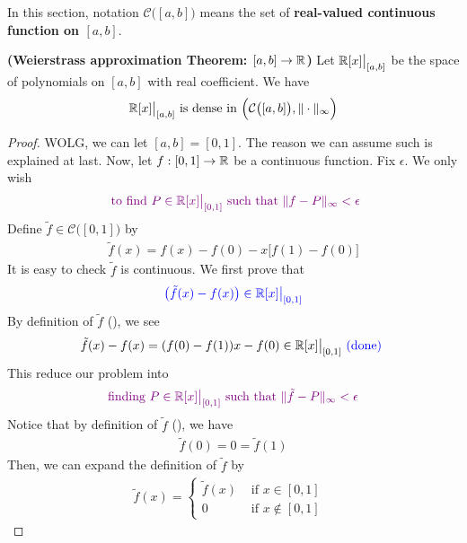 \documentclass{report}
\begin{document}
\begin{mdframed}
In this section, notation  $\mathcal{C}\big([a,b] \big)$ means the set of \textbf{real-valued continuous function on $[a,b]$}.
\end{mdframed}
\begin{theorem}
\label{WaT}
\textbf{(Weierstrass approximation Theorem: $[a,b]\rightarrow \mathbb{R}$)} Let $\mathbb{R}[x]\big|_{[a,b]}$ be the space of polynomials on $[a,b]$ with real coefficient. We have 
\begin{align*}
\text{ $\mathbb{R}[x]\big|_{[a,b]}$ is dense in $\Big(\mathcal{C}\big([a,b] \big),\| \cdot \|_{\infty} \Big)$ }
\end{align*}
\end{theorem}
\begin{proof}
WOLG, we can let $[a,b]=[0,1]$. The reason we can assume such is explained at last. Now, let $f:[0,1]\rightarrow \mathbb{R}$ be a continuous function. Fix $\epsilon $. We only wish 
\begin{align*}
\textcolor{violet}{\text{ to find $P \in \mathbb{R}[x]\big|_{[0,1]}$ such that $\| f-P \|_{\infty}<\epsilon $}}
\end{align*}
Define $\tilde{f} \in \mathcal{C}\big([0,1] \big)$ by 
\begin{align}
  \label{tse1}
\tilde{f}(x)= f(x)-f(0)-x \big[f(1)-f(0) \big] 
\end{align}
It is easy to check $\tilde{f}$ is continuous. We first prove that 
\begin{align*}
\textcolor{blue}{\big( \tilde{f}(x)-f(x)\big)\in \mathbb{R}[x]\big|_{[0,1]}  }
\end{align*}
By definition of $\tilde{f} $ (), we see 
\begin{align*}
\tilde{f}(x)-f(x)=(f(0)-f(1))x- f(0)\in \mathbb{R}[x]\big|_{[0,1]}\textcolor{blue}{\text{ (done) }}
\end{align*}
This reduce our problem into 
\begin{align*}
\textcolor{violet}{\text{ finding }P\in \mathbb{R}[x]\big|_{[0,1]}\text{ such that $\| \tilde{f}-P \|_{\infty}<\epsilon $ }}
\end{align*}
Notice that by definition of $\tilde{f}$ (), we have 
\begin{align*}
\tilde{f}(0)=0=\tilde{f}(1) 
\end{align*}
Then, we can expand the definition of $\tilde{f} $  by
\begin{align}
\label{tse2}  
\tilde{f}(x)=\begin{cases}
  \tilde{f} (x)& \text{ if $x\in [0,1]$ }\\
  0& \text{ if $x \not \in [0,1]$ }

\end{cases}
\end{align}
\end{proof}
\end{document}
